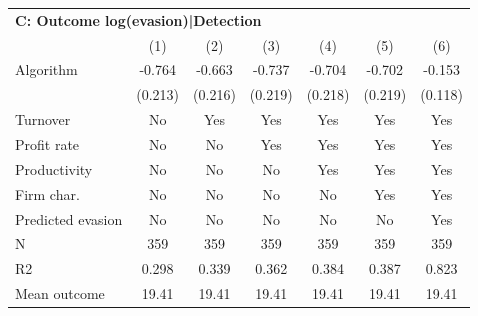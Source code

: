 \begin{tabular}{lcccccc}
\midrule \multicolumn{7}{l}{\textbf{C: Outcome log(evasion)|Detection}} \\ \multicolumn{1}{l}{} & (1) & (2) & (3) & (4) & (5) & (6) \\ \midrule
Algorithm   &      -0.764\sym{***}&      -0.663\sym{***}&      -0.737\sym{***}&      -0.704\sym{***}&      -0.702\sym{***}&      -0.153         \\
            &     (0.213)         &     (0.216)         &     (0.219)         &     (0.218)         &     (0.219)         &     (0.118)         \\
\midrule
Turnover    &          No         &         Yes         &         Yes         &         Yes         &         Yes         &         Yes         \\
Profit rate &          No         &          No         &         Yes         &         Yes         &         Yes         &         Yes         \\
Productivity&          No         &          No         &          No         &         Yes         &         Yes         &         Yes         \\
Firm char.  &          No         &          No         &          No         &          No         &         Yes         &         Yes         \\
Predicted evasion&          No         &          No         &          No         &          No         &          No         &         Yes         \\
N           &         359         &         359         &         359         &         359         &         359         &         359         \\
R2          &       0.298         &       0.339         &       0.362         &       0.384         &       0.387         &       0.823         \\
Mean outcome&       19.41         &       19.41         &       19.41         &       19.41         &       19.41         &       19.41         \\
\bottomrule \end{tabular}
